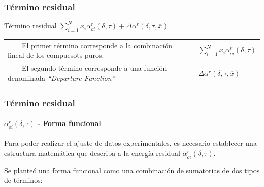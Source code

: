 \documentclass[aspectratio=1610,multi,rgb]{beamer}
\newcommand{\tabitem}{~~\llap{\textbullet}~~}
\begin{document}
\subsubsection{Término residual}

\begin{frame}{Término residual}
	{$\sum\limits_{i=1}^N x_i\alpha_{oi}^r(\delta,\tau)
		+ \Delta\alpha^r(\delta,\tau,\overline{x})$}
		\begin{tabular}{p{}p{}<{\centering}}
	\tabitem El primer término corresponde a la combinación
		lineal de los compuesots puros.
	&
	$\sum\limits_{i=1}^N x_i\alpha_{oi}^r(\delta,\tau)$
	\\
	\tabitem El segundo término corresponde a una función denominada
	\emph{``Departure Function''}
	&
	$\Delta\alpha^r(\delta,\tau,\overline{x})$ \\
	\end{tabular}
\end{frame}



\begin{frame}
	\frametitle{Término residual}
	\framesubtitle{$\alpha_{oi}^r(\delta,\tau)$ - Forma funcional}
	Para poder realizar el ajuste de datos experimentales, es necesario
	establecer una estructura matemática que describa a la energía residual
	$\alpha_{oi}^r(\delta,\tau)$. 

	Se planteó una forma funcional como una combinación de sumatorias de
	dos tipos de términos:

	\begin{description}
	\end{description}
\end{frame}
\end{document}
